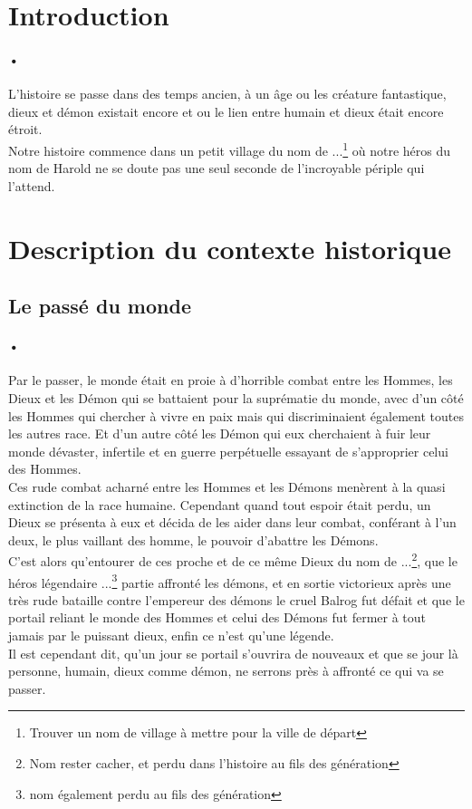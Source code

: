 \section{Introduction}

\paragraph{•}L'histoire se passe dans des temps ancien, à un âge ou les créature fantastique, dieux et démon existait encore et ou le lien entre humain et dieux était encore étroit.\\
Notre histoire commence dans un petit village du nom de ...\footnote{Trouver un nom de village à mettre pour la ville de départ} où notre héros du nom de Harold ne se doute pas une seul seconde de l'incroyable périple qui l'attend.
\newpage


\section{Description du contexte historique}
\subsection{Le passé du monde}
\paragraph{•}Par le passer, le monde était en proie à d'horrible combat entre les Hommes, les Dieux et les Démon qui se battaient pour la suprématie du monde, avec d'un côté les Hommes qui chercher à vivre en paix mais qui discriminaient également toutes les autres race. Et d'un autre côté les Démon qui eux cherchaient à fuir leur monde dévaster, infertile et en guerre perpétuelle essayant de s'approprier celui des Hommes.\\
Ces rude combat acharné entre les Hommes et les Démons menèrent à la quasi extinction de la race humaine. Cependant quand tout espoir était perdu, un Dieux se présenta à eux et décida de les aider dans leur combat, conférant à l'un deux, le plus vaillant des homme, le pouvoir d'abattre les Démons.\\
C'est alors qu'entourer de ces proche et de ce même Dieux du nom de ...\footnote{Nom rester cacher, et perdu dans l'histoire au fils des génération}, que le héros légendaire ...\footnote{nom également perdu au fils des génération} partie affronté les démons, et en sortie victorieux après une très rude bataille contre l'empereur des démons le cruel Balrog fut défait et que le portail reliant le monde des Hommes et celui des Démons fut fermer à tout jamais par le puissant dieux, enfin ce n'est qu'une légende.\\
Il est cependant dit, qu'un jour se portail s'ouvrira de nouveaux et que se jour là personne, humain, dieux comme démon, ne serrons près à affronté ce qui va se passer.

